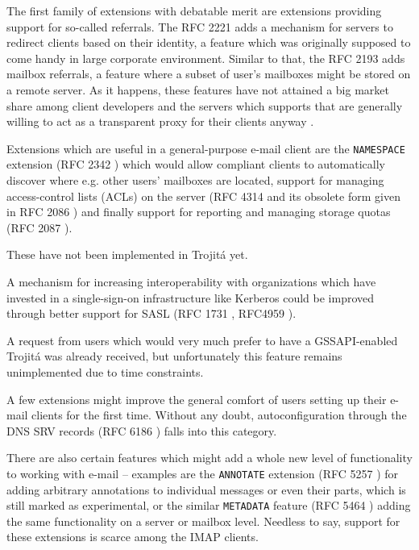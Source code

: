 \documentclass[trojita]{subfiles}
\begin{document}
The first family of extensions with debatable merit are extensions providing support for so-called referrals.  The RFC
2221 \cite{rfc2221} adds a mechanism for servers to redirect clients based on their identity, a feature which was
originally supposed to come handy in large corporate environment.  Similar to that, the RFC 2193 \cite{rfc2193} adds
mailbox referrals, a feature where a subset of user's mailboxes might be stored on a remote server.  As it happens,
these features have not attained a big market share among client developers \cite{thunderbird-referrals} and the servers
which supports that are generally willing to act as a transparent proxy for their clients anyway
\cite{cyrus-referral-proxy}.

Extensions which are useful in a general-purpose e-mail client are the {\tt NAMESPACE} extension (RFC 2342
\cite{rfc2342}) which would allow compliant clients to automatically discover where e.g. other users' mailboxes are
located, support for managing access-control lists (ACLs) on the server (RFC 4314 \cite{rfc4314} and its obsolete form
given in RFC 2086 \cite{rfc2086}) and finally support for reporting and managing storage quotas (RFC 2087
\cite{rfc2087}).

\begin{trojitabehavior}
These have not been implemented in Trojitá yet.
\end{trojitabehavior}

A mechanism for increasing interoperability with organizations which have invested in a single-sign-on infrastructure
like Kerberos could be improved through better support for SASL (RFC 1731 \cite{rfc1731}, RFC4959 \cite{rfc4959}).

\begin{trojitabehavior}
A request from users which would very much prefer to have a GSSAPI-enabled Trojitá was already received, but
unfortunately this feature remains unimplemented due to time constraints.
\end{trojitabehavior}

A few extensions might improve the general comfort of users setting up their e-mail clients for the first time.  Without
any doubt, autoconfiguration through the DNS SRV records (RFC 6186 \cite{rfc6186}) falls into this category.

There are also certain features which might add a whole new level of functionality to working with e-mail -- examples
are the {\tt ANNOTATE} extension (RFC 5257 \cite{rfc5257}) for adding arbitrary annotations to individual messages or
even their parts, which is still marked as experimental, or the similar {\tt METADATA} feature (RFC 5464 \cite{rfc5464})
adding the same functionality on a server or mailbox level.  Needless to say, support for these extensions is scarce
among the IMAP clients.
\end{document}
